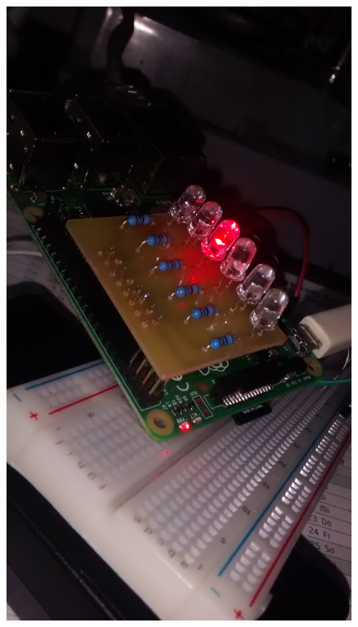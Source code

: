 \documentclass{article}
\begin{document}
\begin{figure}[H]
\includegraphics[height=0.27\textheight]{led/vista4}

\end{figure}
\end{document}
